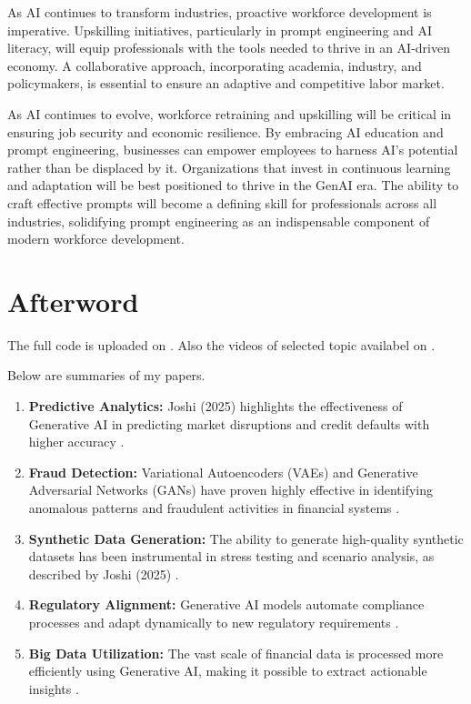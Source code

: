 \documentclass[a4paper,headinclude=on,footinclude=on,12pt,oneside]{scrbook}
\begin{document}
As AI continues to transform industries, proactive workforce development is imperative. Upskilling initiatives, particularly in prompt engineering and AI literacy, will equip professionals with the tools needed to thrive in an AI-driven economy. A collaborative approach, incorporating academia, industry, and policymakers, is essential to ensure an adaptive and competitive labor market.


As AI continues to evolve, workforce retraining and upskilling will be critical in ensuring job security and economic resilience. By embracing AI education and prompt engineering, businesses can empower employees to harness AI’s potential rather than be displaced by it. Organizations that invest in continuous learning and adaptation will be best positioned to thrive in the GenAI era. The ability to craft effective prompts will become a defining skill for professionals across all industries, solidifying prompt engineering as an indispensable component of modern workforce development.






\chapter*{Afterword}


The full code is uploaded on \cite{JoshiGit2025}.
Also the videos of selected topic availabel on \cite{JoshiYouTube2025}.

Below are summaries of my papers.

\begin{enumerate}
	\item \textbf{Predictive Analytics:} Joshi (2025) highlights the effectiveness of Generative AI in predicting market disruptions and credit defaults with higher accuracy \cite{JoshiIJFMR2025}.
	\item \textbf{Fraud Detection:} Variational Autoencoders (VAEs) and Generative Adversarial Networks (GANs) have proven highly effective in identifying anomalous patterns and fraudulent activities in financial systems \cite{JoshiCSEIT2025}.
	\item \textbf{Synthetic Data Generation:} The ability to generate high-quality synthetic datasets has been instrumental in stress testing and scenario analysis, as described by Joshi (2025) \cite{JoshiIJIREM2025}.
	\item \textbf{Regulatory Alignment:} Generative AI models automate compliance processes and adapt dynamically to new regulatory requirements \cite{JoshiIJIREM2025}.
	\item \textbf{Big Data Utilization:} The vast scale of financial data is processed more efficiently using Generative AI, making it possible to extract actionable insights \cite{JoshiIJIREM2025}.
\end{enumerate}
\end{document}
